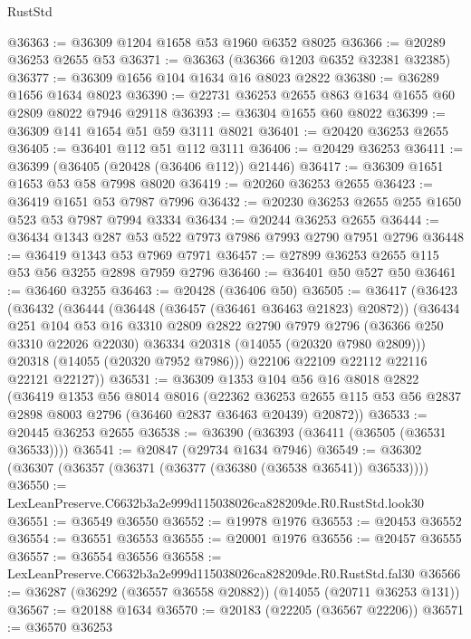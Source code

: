 \begin{lexlean}{RustStd}
\begin{coremodule}
@36363 := @36309 @1204 @1658 @53 @1960 @6352 @8025
@36366 := @20289 @36253 @2655 @53
@36371 := @36363 (@36366 @1203 @6352 @32381 @32385)
@36377 := @36309 @1656 @104 @1634 @16 @8023 @2822
@36380 := @36289 @1656 @1634 @8023
@36390 := @22731 @36253 @2655 @863 @1634 @1655 @60 @2809 @8022 @7946 @29118
@36393 := @36304 @1655 @60 @8022
@36399 := @36309 @141 @1654 @51 @59 @3111 @8021
@36401 := @20420 @36253 @2655
@36405 := @36401 @112 @51 @112 @3111
@36406 := @20429 @36253
@36411 := @36399 (@36405 (@20428 (@36406 @112)) @21446)
@36417 := @36309 @1651 @1653 @53 @58 @7998 @8020
@36419 := @20260 @36253 @2655
@36423 := @36419 @1651 @53 @7987 @7996
@36432 := @20230 @36253 @2655 @255 @1650 @523 @53 @7987 @7994 @3334
@36434 := @20244 @36253 @2655
@36444 := @36434 @1343 @287 @53 @522 @7973 @7986 @7993 @2790 @7951 @2796
@36448 := @36419 @1343 @53 @7969 @7971
@36457 := @27899 @36253 @2655 @115 @53 @56 @3255 @2898 @7959 @2796
@36460 := @36401 @50 @527 @50
@36461 := @36460 @3255
@36463 := @20428 (@36406 @50)
@36505 := @36417
    (@36423
      (@36432
        (@36444
          (@36448 (@36457 (@36461 @36463 @21823) @20872))
          (@36434
            @251
            @104
            @53
            @16
            @3310
            @2809
            @2822
            @2790
            @7979
            @2796
            (@36366 @250 @3310 @22026 @22030)
            @36334
            @20318
            (@14055 (@20320 @7980 @2809)))
          @20318
          (@14055 (@20320 @7952 @7986)))
        @22106
        @22109
        @22112
        @22116
        @22121
        @22127))
@36531 := @36309
    @1353
    @104
    @56
    @16
    @8018
    @2822
    (@36419
      @1353
      @56
      @8014
      @8016
      (@22362
        @36253
        @2655
        @115
        @53
        @56
        @2837
        @2898
        @8003
        @2796
        (@36460 @2837 @36463 @20439)
        @20872))
@36533 := @20445 @36253 @2655
@36538 := @36390 (@36393 (@36411 (@36505 (@36531 @36533))))
@36541 := @20847 (@29734 @1634 @7946)
@36549 := @36302 (@36307 (@36357 (@36371 (@36377 (@36380 (@36538 @36541)) @36533))))
@36550 := LexLeanPreserve.C6632b3a2e999d115038026ca828209de.R0.RustStd.look30
@36551 := @36549 @36550
@36552 := @19978 @1976
@36553 := @20453 @36552
@36554 := @36551 @36553
@36555 := @20001 @1976
@36556 := @20457 @36555
@36557 := @36554 @36556
@36558 := LexLeanPreserve.C6632b3a2e999d115038026ca828209de.R0.RustStd.fal30
@36566 := @36287 (@36292 (@36557 @36558 @20882)) (@14055 (@20711 @36253 @131))
@36567 := @20188 @1634
@36570 := @20183 (@22205 (@36567 @22206))
@36571 := @36570 @36253

\end{coremodule}
\end{lexlean}
